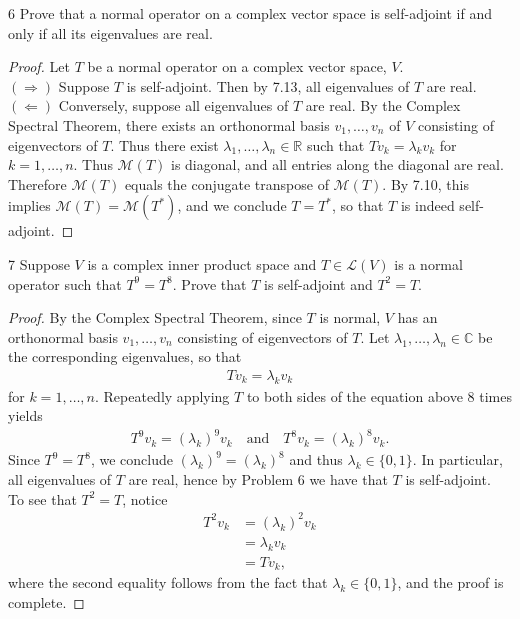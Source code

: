\documentclass{extarticle}
\newenvironment{problem}[1]{\begin{prob*}{#1}{}}{\end{prob*}}
\newcommand{\R}{\mathbb{R}}
\newcommand{\C}{\mathbb{C}}
\newcommand{\mat}{\mathcal{M}}
\newcommand{\Hom}{\mathcal{L}}
\begin{document}
\begin{problem}{6}
Prove that a normal operator on a complex vector space is self-adjoint if and only if all its eigenvalues are real.
\end{problem}
\begin{proof}
Let $T$ be a normal operator on a complex vector space, $V$.\\
\indent $(\Rightarrow)$ Suppose $T$ is self-adjoint.  Then by 7.13, all eigenvalues of $T$ are real.\\
\indent $(\Leftarrow)$ Conversely, suppose all eigenvalues of $T$ are real.  By the Complex Spectral Theorem, there exists an orthonormal basis $v_1,\dots, v_n$ of $V$ consisting of eigenvectors of $T$.  Thus there exist $\lambda_1,\dots, \lambda_n\in\R$ such that $Tv_k = \lambda_k v_k$ for $k = 1,\dots, n$.  Thus $\mat(T)$ is diagonal, and all entries along the diagonal are real.  Therefore $\mat(T)$ equals the conjugate transpose of $\mat(T)$.  By 7.10, this implies $\mat(T) = \mat(T^\ast)$, and we conclude $T = T^\ast$, so that $T$ is indeed self-adjoint.
\end{proof}

\begin{problem}{7}
Suppose $V$ is a complex inner product space and $T\in\Hom(V)$ is a normal operator such that $T^9 = T^8$.  Prove that $T$ is self-adjoint and $T^2 = T$.   
\end{problem}
\begin{proof}
By the Complex Spectral Theorem, since $T$ is normal, $V$ has an orthonormal basis $v_1,\dots, v_n$ consisting of eigenvectors of $T$.  Let $\lambda_1,\dots, \lambda_n\in\C$ be the corresponding eigenvalues, so that
\begin{align*}
Tv_k = \lambda_k v_k
\end{align*}
for $k = 1,\dots, n$.  Repeatedly applying $T$ to both sides of the equation above $8$ times yields
\begin{align*}
T^9v_k = (\lambda_k)^9 v_k\quad\text{and}\quad T^8v_k = (\lambda_k)^8 v_k.
\end{align*}
Since $T^9 = T^8$, we conclude $(\lambda_k)^9 = (\lambda_k)^8$ and thus $\lambda_k\in\{0, 1\}$.  In particular, all eigenvalues of $T$ are real, hence by Problem 6 we have that $T$ is self-adjoint.\\
\indent To see that $T^2 = T$, notice 
\begin{align*}
T^2v_k &= (\lambda_k)^2v_k\\
&= \lambda_k v_k\\
&=Tv_k,
\end{align*}
where the second equality follows from the fact that $\lambda_k\in\{0,1\}$, and the proof is complete.
\end{proof}
\end{document}
